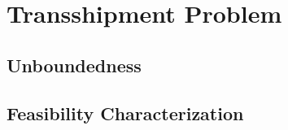 \documentclass[../../main.tex]{subfiles}
\begin{document}
\section{Transshipment Problem}





\subsection{Unboundedness}
\subsection{Feasibility Characterization}\label{sec:tp_feasiblity-characterization}
\end{document}
